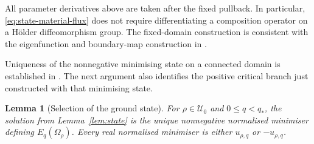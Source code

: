\documentclass[11pt,a4paper]{article}
\newtheorem{lemma}[theorem]{Lemma}
\theoremstyle{definition}
\theoremstyle{remark}
\begin{document}
All parameter derivatives above are taken after the fixed pullback.
In particular, \eqref{eq:state-material-flux} does not require
differentiating a composition operator on a H\"older diffeomorphism
group.  The fixed-domain construction is consistent with the
eigenfunction and boundary-map construction in
\cite[Propositions~3.2 and 5.1]{PacardSicbaldi2009}.

Uniqueness of the nonnegative minimising state on a connected domain
is established in \cite[Proposition~2.9]{MMR2025}.  The next argument
also identifies the positive critical branch just constructed with
that minimising state.

\begin{lemma}[Selection of the ground state]
\label{lem:selection}
For $\rho\in\mathcal U_0$ and $0\leq q<q_*$, the solution from
Lemma~\ref{lem:state} is the unique nonnegative normalised minimiser
defining $E_q(\Omega_\rho)$.  Every real normalised minimiser is either
$u_{\rho,q}$ or $-u_{\rho,q}$.
\end{lemma}
\end{document}
